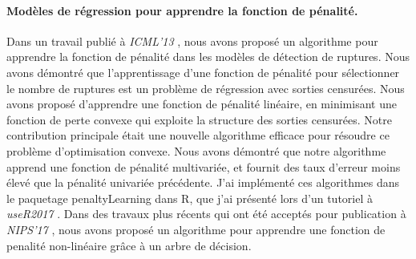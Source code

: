 \paragraph{Modèles de régression pour apprendre la fonction de pénalité.}

Dans un travail publié à \emph{ICML'13} \citep{HOCKING-penalties},
nous avons proposé un algorithme pour apprendre la fonction de
pénalité dans les modèles de détection de ruptures. Nous avons
démontré que l'apprentissage d'une fonction de pénalité pour
sélectionner le nombre de ruptures est un problème de régression avec
sorties censurées. Nous avons proposé d'apprendre une fonction de
pénalité linéaire, en minimisant une fonction de perte convexe qui
exploite la structure des sorties censurées. Notre contribution
principale était une nouvelle algorithme efficace pour résoudre ce
problème d'optimisation convexe. Nous avons démontré que notre
algorithme apprend une fonction de pénalité multivariée, et fournit
des taux d'erreur moins élevé que la pénalité univariée
précédente. J'ai implémenté ces algorithmes dans le paquetage
penaltyLearning dans R, que j'ai présenté lors d'un tutoriel à
\emph{useR2017} \citep{change-tutoriel}. Dans des travaux plus récents
qui ont été acceptés pour publication à \emph{NIPS'17} \citep{MMIT},
nous avons proposé un algorithme pour apprendre une fonction de
penalité non-linéaire grâce à un arbre de décision.

